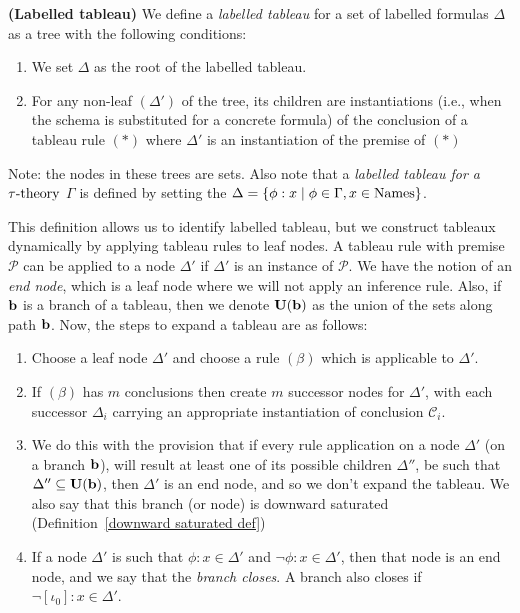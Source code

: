 \begin{definition}\label{labelled tableau def}
\renewcommand*\linenumberstyle[1]{}
    \textbf{(Labelled tableau)} We define a \textit{labelled tableau} for a set of labelled formulas $\Delta$ as a tree with the following conditions:
    \begin{enumerate}
        \item We set $\Delta$ as the root of the labelled tableau.
        \item For any non-leaf $(\Delta')$ of the tree, its children are instantiations (i.e., when the schema is substituted for a concrete formula) of the conclusion of a tableau rule $(*)$ where $\Delta'$ is an instantiation of the premise of $(*)$
    \end{enumerate}


\par Note: the nodes in these trees are sets. Also note that a \textit{labelled tableau for a $\tau\text{-theory}$ $\Gamma$} is defined by setting the $\Delta = \{\phi:x\mid \phi\in\Gamma, x\in\text{Names}\}$. 

\end{definition}

\begin{remark}
\par This definition allows us to identify labelled tableau, but we construct tableaux dynamically by applying tableau rules to leaf nodes. A tableau rule with premise $\mathcal{P}$ can be applied to a node $\Delta'$ if $\Delta'$ is an instance of $\mathcal{P}$. We have the notion of an \textit{end node}, which is a leaf node where we will not apply an inference rule. Also, if $\textbf{b}$ is a branch of a tableau, then we denote $\textbf{U}(\textbf{b})$ as the union of the sets along path $\textbf{b}$. Now, the steps to expand a tableau are as follows:
    \begin{enumerate}[label=(\roman*)]
        \item Choose a leaf node $\Delta'$ and choose a rule $(\beta)$ which is applicable to $\Delta'$.
        \item If $(\beta)$ has $m$ conclusions then create $m$ successor nodes for $\Delta'$, with each successor $\Delta_i$ carrying an appropriate instantiation of conclusion $\mathcal{C}_i$.
        \item We do this with the provision that if every rule application on a node $\Delta'$ (on a branch $\textbf{b}$), will result at least one of its possible children $\Delta''$, be such that $\Delta''\subseteq \textbf{U}(\textbf{b})$, then $\Delta'$ is an end node, and so we don't expand the tableau. We also say that this branch (or node) is downward saturated (Definition~\ref{downward saturated def})
        \item \label{Labelled tableau step (iv)}If a node $\Delta'$ is such that $\phi:x\in\Delta'$ and $\neg\phi:x\in\Delta'$, then that node is an end node, and we say that the \textit{branch closes}. A branch also closes if $\neg[\iota_0]:x\in\Delta'$.
    \end{enumerate}
\end{remark}


